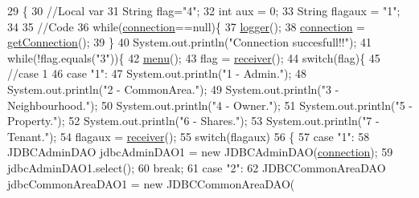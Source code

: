 \begin{DoxyCode}
29                                                               \{
30         \textcolor{comment}{//Local var}
31         String flag=\textcolor{stringliteral}{"4"};
32         \textcolor{keywordtype}{int} aux = 0;
33         String flagaux = \textcolor{stringliteral}{"1"};
34         
35         \textcolor{comment}{//Code}
36         \textcolor{keywordflow}{while}(\mbox{\hyperlink{classcms_1_1_c_m_s_afc28cfd2c4356509b85775219b7b1e05}{connection}}==null)\{
37         \mbox{\hyperlink{classcms_1_1_c_m_s_a8c344bccd734ba0a3dbadb99d2fcbed1}{logger}}();        
38         \mbox{\hyperlink{classcms_1_1_c_m_s_afc28cfd2c4356509b85775219b7b1e05}{connection}} = \mbox{\hyperlink{classcms_1_1_c_m_s_ae70f453d4704bfb9d89ddc637c52dc30}{getConnection}}();
39         \}
40         System.out.println(\textcolor{stringliteral}{"Connection succesfull!!"});
41         \textcolor{keywordflow}{while}(!flag.equals(\textcolor{stringliteral}{"3"}))\{
42         \mbox{\hyperlink{classcms_1_1_c_m_s_a3256378f3b9ccd38f1db10ee80daf9f3}{menu}}();
43         flag = \mbox{\hyperlink{classcms_1_1_c_m_s_ad13be0e97a0bb295dcedd134942a79b4}{receiver}}();
44         \textcolor{keywordflow}{switch}(flag)\{
45             \textcolor{comment}{//case 1}
46             \textcolor{keywordflow}{case} \textcolor{stringliteral}{"1"}:
47                 System.out.println(\textcolor{stringliteral}{"1 - Admin."});
48                 System.out.println(\textcolor{stringliteral}{"2 - CommonArea."});
49                 System.out.println(\textcolor{stringliteral}{"3 - Neighbourhood."});
50                 System.out.println(\textcolor{stringliteral}{"4 - Owner."});
51                 System.out.println(\textcolor{stringliteral}{"5 - Property."});
52                 System.out.println(\textcolor{stringliteral}{"6 - Shares."});
53                 System.out.println(\textcolor{stringliteral}{"7 - Tenant."});
54                 flagaux = \mbox{\hyperlink{classcms_1_1_c_m_s_ad13be0e97a0bb295dcedd134942a79b4}{receiver}}();
55                 \textcolor{keywordflow}{switch}(flagaux)
56                 \{
57                     \textcolor{keywordflow}{case} \textcolor{stringliteral}{"1"}:
58                         JDBCAdminDAO jdbcAdminDAO1 = \textcolor{keyword}{new} JDBCAdminDAO(\mbox{\hyperlink{classcms_1_1_c_m_s_afc28cfd2c4356509b85775219b7b1e05}{connection}});
59                         jdbcAdminDAO1.select();
60                     \textcolor{keywordflow}{break};
61                     \textcolor{keywordflow}{case} \textcolor{stringliteral}{"2"}:
62                         JDBCCommonAreaDAO jdbcCommonAreaDAO1 = \textcolor{keyword}{new} JDBCCommonAreaDAO(

\end{DoxyCode}
